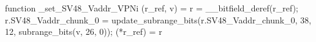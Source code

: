 function _set_SV48_Vaddr_VPNi (r_ref, v) = {
    r = __bitfield_deref(r_ref);
    r.SV48_Vaddr_chunk_0 = update_subrange_bits(r.SV48_Vaddr_chunk_0, 38, 12, subrange_bits(v, 26, 0));
    (*r_ref) = r
}
